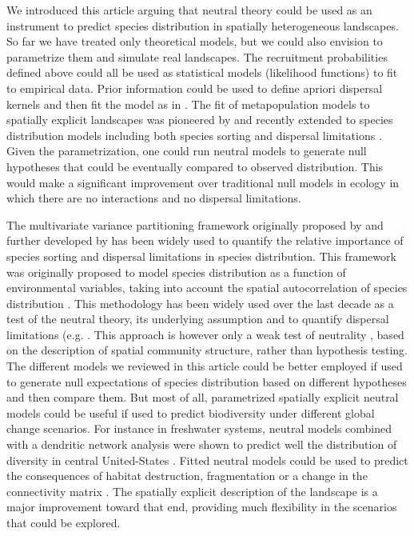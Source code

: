 \documentclass[12pt]{article}
\begin{document}
We introduced this article arguing that neutral theory could be used as an
instrument to predict species distribution in spatially heterogeneous
landscapes. So far we have treated only theoretical models, but we could also
envision to parametrize them and simulate real landscapes. The recruitment
probabilities defined above could all be used as statistical models (likelihood
functions) to fit to empirical data. Prior information could be used to define
apriori dispersal kernels and then fit the model as in \textcite{Gravel2008}.
The fit of metapopulation models to spatially explicit landscapes was pioneered
by \textcite{Hanski1998} and recently extended to species distribution models
including both species sorting and dispersal limitations
\parencite{Boulangeat2012}. Given the parametrization, one could run neutral
models to generate null hypotheses that could be eventually compared to observed
distribution. This would make a significant improvement over traditional null
models in ecology \parencite{Gotelli1996} in which there are no interactions and no dispersal
limitations.

The multivariate variance partitioning framework originally proposed by
\textcite{Borcard1992} and further developed by \textcite{Borcard2002} has been
widely used to quantify the relative importance of species sorting and dispersal
limitations in species distribution. This framework was originally proposed to
model species distribution as a function of environmental variables, taking into
account the spatial autocorrelation of species distribution
\parencite{Leduc1992, Borcard1992, Legendre1993}. This methodology has been
widely used over the last decade as a test of the neutral theory, its underlying
assumption and to quantify dispersal limitations (e.g. \textcite{Svenning2004,
Hardy2004, Gilbert2004, Cottenie2005}. This approach is however only a weak test
of neutrality \parencite{McGill2003}, based on the description of spatial
community structure, rather than hypothesis testing. The different models we
reviewed in this article could be better employed if used to generate null
expectations of species distribution based on different hypotheses and then
compare them. But most of all, parametrized spatially explicit neutral models
could be useful if used to predict biodiversity under different global change
scenarios. For instance in freshwater systems, neutral models combined with a
dendritic network analysis were shown to predict well the distribution of
diversity in central United-States \parencite{Muneepeerakul2008}. Fitted neutral
models could be used to predict the consequences of habitat destruction,
fragmentation or a change in the connectivity matrix \parencite{Hubbell2008}.
The spatially explicit description of the landscape is a major improvement
toward that end, providing much flexibility in the scenarios that could be
explored.
\end{document}
